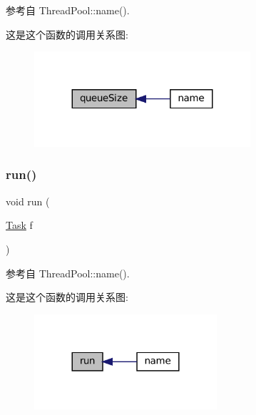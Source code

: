 参考自 Thread\+Pool\+::name().

这是这个函数的调用关系图\+:
\nopagebreak
\begin{figure}[H]
\begin{center}
\leavevmode
\includegraphics[width=227pt]{classmuduo_1_1ThreadPool_a0eff42734d64323acbd2e676bcd27b76_icgraph}
\end{center}
\end{figure}
\mbox{\label{classmuduo_1_1ThreadPool_a47954c90f031defe912d2acc4d9f7b2f}} 
\subsubsection{\texorpdfstring{run()}{run()}}
{\footnotesize\ttfamily void run (\begin{DoxyParamCaption}\item[{\hyperlink{classmuduo_1_1ThreadPool_a46c264006febdf6c5dae5921d59c18d2}{Task}}]{f }\end{DoxyParamCaption})}



参考自 Thread\+Pool\+::name().

这是这个函数的调用关系图\+:
\nopagebreak
\begin{figure}[H]
\begin{center}
\leavevmode
\includegraphics[width=192pt]{classmuduo_1_1ThreadPool_a47954c90f031defe912d2acc4d9f7b2f_icgraph}
\end{center}
\end{figure}
\mbox{\label{classmuduo_1_1ThreadPool_aa749f15d9283ccb246c7d458e2eea2d5}} 
